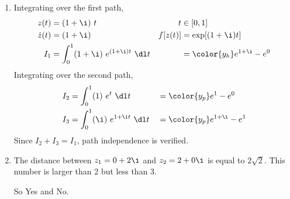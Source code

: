 \begin{enumerate}
    \item Integrating over the first path,
          \begin{align}
              z(t)       & = (1 + \i)\ t                               &
              t          & \in [0, 1]                                    \\
              \dot{z}(t) & = (1 + \i)                                  &
              f[z(t)]    & = \exp[(1+\i)t]                               \\
              I_1        & = \int_{0}^{1} (1 + \i)\ e^{(1+\i)t}\ \dl t &
                         & = \color{y_h} e^{1+\i} - e^{0}
          \end{align}
          Integrating over the second path,
          \begin{align}
              I_2 & = \int_{0}^{1} (1)\ e^{t}\ \dl t         &
                  & = \color{y_p} e^{1} - e^{0}                \\
              I_3 & = \int_{0}^{1} (\i)\ e^{1 + \i t}\ \dl t &
                  & = \color{y_p} e^{1+\i} - e^{1}             \\
          \end{align}
          Since $ I_2 + I_3 = I_1 $, path independence is verified.

    \item The distance between $ z_1 = 0 + 2\i $ and $ z_2 = 2 + 0\i $ is equal to
          $ 2\sqrt{2} $. This number is larger than 2 but less than 3. \par
          So \textcolor{y_h}{Yes} and \textcolor{y_p}{No}.


\end{enumerate}
